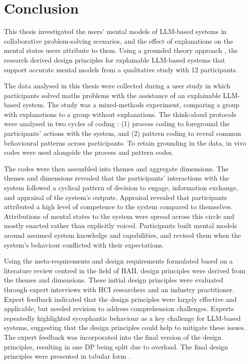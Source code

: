\section{Conclusion} \label{sec:conclusion}

This thesis investigated the users' mental models of \ac{LLM}-based systems in collaborative problem-solving scenarios, and the effect of explanations on the mental states users attribute to them. Using a grounded theory approach \parencite{Gioia2013}, the research derived design principles for explainable \ac{LLM}-based systems that support accurate mental models from a qualitative study with 12 participants.

The data analysed in this thesis were collected during a user study in which participants solved maths problems with the assistance of an explainable \ac{LLM}-based system. The study was a mixed-methods experiment, comparing a group with explanations to a group without explanations. The think-aloud protocols were analysed in two cycles of coding \parencite{Saldana2015}: (1) process coding to foreground the participants' actions with the system, and (2) pattern coding to reveal common behavioural patterns across participants. To retain grounding in the data, in vivo codes were used alongside the process and pattern codes.

The codes were then assembled into themes and aggregate dimensions. The themes and dimensions revealed that the participants' interactions with the system followed a cyclical pattern of decision to engage, information exchange, and appraisal of the system's outputs. Appraisal revealed that participants attributed a high level of competence to the system compared to themselves. Attributions of mental states to the system were spread across this circle and mostly enacted rather than explicitly voiced. Participants built mental models around assumed system knowledge and capabilities, and revised them when the system's behaviour conflicted with their expectations.

Using the meta-requirements and design requirements formulated based on a literature review \parencite{Boell2014} centred in the field of \ac{HAII}, design principles were derived from the themes and dimensions. These initial design principles were evaluated through expert interviews with \ac{HCI} researchers and an industry practitioner. Expert feedback indicated that the design principles were largely effective and applicable, but needed revision to address comprehension challenges. Experts repeatedly highlighted sycophantic behaviour as a key challenge for \ac{LLM}-based systems, suggesting that the design principles could help to mitigate these issues. The expert feedback was incorporated into the final version of the design principles, resulting in one \ac{DP} being split due to overload. The final design principles were presented in tabular form \parencite[cf.][]{Gregor2020}.

